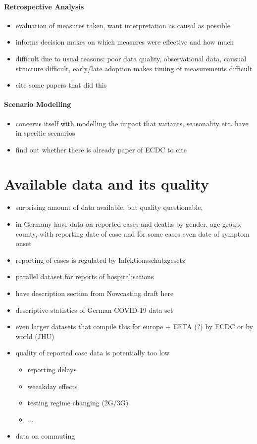 \paragraph{Retrospective Analysis}
\begin{itemize}
    \item evaluation of measures taken, want interpretation as causal as possible
    \item informs decision makes on which measures were effective and how much
    \item difficult due to usual reasons: poor data quality, observational data, causual structure difficult, early/late adoption makes timing of measurements difficult
    \item cite some papers that did this \cite{Flaxman2020Estimating,Brauner2021Inferring,Khazaei2023Using}
\end{itemize}
\paragraph{Scenario Modelling}

\begin{itemize}
    \item concerns itself with modelling the impact that variants, seasonality etc. have in specific scenarios 
    \item find out whether there is already paper of ECDC to cite
\end{itemize}

\section{Available data and its quality}
\label{sec:data}

\begin{itemize}
    \item surprising amount of data available, but quality questionable, 
    \item in Germany have data on reported cases and deaths by gender, age group, county, with reporting date of case and for some cases even date of symptom onset
    \item reporting of cases is regulated by Infektionsschutzgesetz
    \item parallel dataset for reports of hospitalisations 
    \item have description section from Nowcasting draft here
    \item descriptive statistics of German COVID-19 data set
    \item even larger datasets that compile this for europe + EFTA (?) by ECDC or by world (JHU)
    \item quality of reported case data is potentially too low 
    \begin{itemize}
        \item reporting delays
        \item weeakday effects
        \item testing regime changing (2G/3G)
        \item ...
    \end{itemize}
    \item data on commuting
\end{itemize}

